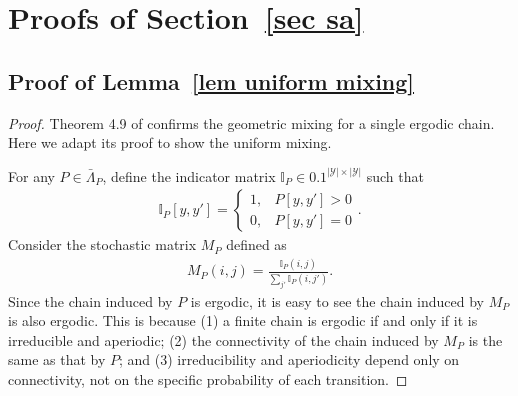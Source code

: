 \documentclass[twoside,11pt]{article}
\newcommand{\fY}{\mathcal{Y}}
\newcommand{\ny}{{|\fY|}}
\numberwithin{assucounter}{section}
\begin{document}

\appendix
\section{Proofs of Section~\ref{sec sa}}
\subsection{Proof of Lemma~\ref{lem uniform mixing}}

\uniformmixing*
\label{sec proof lem uniform mixing}
\begin{proof}
  Theorem 4.9 of \citet{levin2017markov} confirms the geometric mixing for a single ergodic chain.
  Here we adapt its proof to show the uniform mixing.

  For any $P \in \bar \Lambda_P$, 
  define the indicator matrix $\mathbb{I}_P \in \qty{0, 1}^{\ny \times \ny}$ such that 
  \begin{align}
      \mathbb{I}_P[y, y'] = \begin{cases}
          1, & P[y, y'] > 0 \\
          0, & P[y, y'] = 0
      \end{cases}.
  \end{align}
  Consider the stochastic matrix $M_P$ defined as
  \begin{align}
      M_P(i, j) = \frac{\mathbb{I}_P(i, j)}{\sum_{j'} \mathbb{I}_P(i, j')}.
  \end{align}
  Since the chain induced by $P$ is ergodic,
  it is easy to see the chain induced by $M_P$ is also ergodic.
  This is because (1)
  a finite chain is ergodic if and only if it is irreducible and aperiodic;
  (2) the connectivity of the chain induced by $M_P$ is the same as that by $P$;
  and (3) irreducibility and aperiodicity depend only on connectivity, not on the specific probability of each transition. 


\end{proof}
\end{document}
